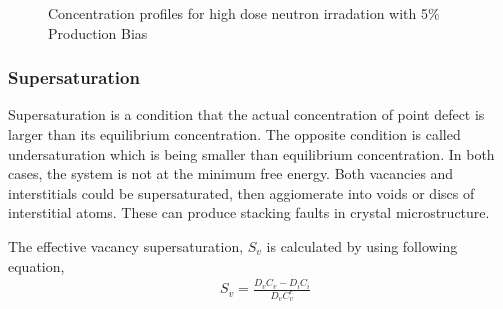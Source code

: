 \documentclass[a4paper]{article}
\begin{document}
\begin{figure}[htb!]
      \caption{Concentration profiles for high dose neutron irradation with 5\% Production Bias}
      \label{figure:concentrations_neutron_5_1e-3}
    \end{figure}

    \newpage
    \subsubsection{Supersaturation} \hspace{10pt}
    Supersaturation is a condition that the actual concentration of point defect is larger than its equilibrium concentration. The opposite condition is called undersaturation which is being smaller than equilibrium concentration. In both cases, the system is not at the minimum free energy. Both vacancies and interstitials could be supersaturated, then aggiomerate into voids or discs of interstitial atoms. These can produce stacking faults in crystal microstructure.

    The effective vacancy supersaturation, ${S_v}$ is calculated by using following equation, \cite{was2016}\\

    \begin{equation}
      \begin{aligned}
        &S_v=\frac{D_vC_v-D_iC_i}{D_vC_v^e}\\
      \end{aligned}
    \end{equation}\\
\end{document}

